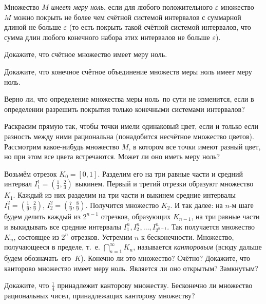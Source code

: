 \documentclass[a4paper, 11pt]{article}
\begin{document}


Множество $M$ \emph{имеет меру ноль}, если для любого
положительного $\varepsilon$ множество $M$ можно покрыть не более
чем счётной системой
интервалов с суммарной длиной не больше $\varepsilon$ (то есть
покрыть такой счётной системой интервалов, что сумма длин любого конечного
набора этих интервалов не больше $\varepsilon$).

Докажите, что счётное множество имеет меру ноль.

Докажите, что
 конечное
 счётное
объединение множеств меры ноль имеет меру ноль.

Верно ли, что определение  множества меры ноль\
по сути не изменится, если в определении разрешить
покрытия только конечными системами интервалов?

Раскрасим прямую так, чтобы точки имели одинаковый цвет,
если и только если
разность между ними рациональна (понадобится несчётное
множество цветов). Рассмотрим какое-нибудь множество $M$, в котором
все точки имеют разный цвет, но при этом все цвета встречаются. Может
ли оно иметь меру ноль?


\label{Kantor}
Возьмём отрезок $K_0=[0,1]$. Разделим его на три равные
части и средний интервал $I_1^1=(\frac13, \frac23)$ выкинем.
Первый и третий отрезки образуют множество $K_1$.
Каждый из них разделим на три части
и выкинем средние интервалы $I_1^2=(\frac19, \frac29)$,
$I_2^2=(\frac79, \frac89)$.
Получится множество $K_2$. И так далее: на $n$-м шаге будем
делить каждый из $2^{n-1}$ отрезков, образующих $K_{n-1}$, на три
равные части и выкидывать все средние интервалы
$I_1^n, I_2^n, \dots, I_{2^{n-1}}^n$.
Так получается множество $K_n$, состоящее из $2^n$ отрезков.
Устремим $n$ к бесконечности.
Множество, получающееся в пределе, т.~е. $\bigcap\limits_{n=1}^{\infty} K_n$,
называется \emph{канторовым} (всюду дальше будем обозначать~его~$K$).
Конечно ли это множество? Счётно?
Докажите, что канторово множество имеет меру ноль.
\пункт
Является ли оно открытым? Замкнутым?

Докажите, что $\frac14$ принадлежит канторову множеству.
\пункт
Бесконечно ли множество рациональных чисел, принадлежащих канторову
множеству?
\end{document}
